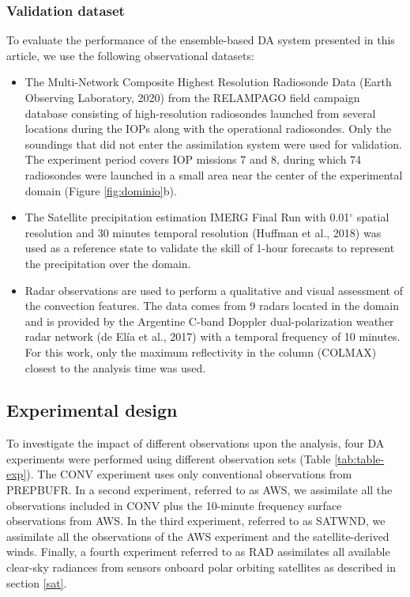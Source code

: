 \documentclass[authoryear,preprint,review,12pt]{elsarticle} %
\begin{document}
\hypertarget{validation-dataset}{%
\subsubsection{Validation dataset}\label{validation-dataset}}

To evaluate the performance of the ensemble-based DA system presented in this article, we use the following observational datasets:

\begin{itemize}
\item
  The Multi-Network Composite Highest Resolution Radiosonde Data (Earth Observing Laboratory, 2020) from the RELAMPAGO field campaign database consisting of high-resolution radiosondes launched from several locations during the IOPs along with the operational radiosondes. Only the soundings that did not enter the assimilation system were used for validation. The experiment period covers IOP missions 7 and 8, during which 74 radiosondes were launched in a small area near the center of the experimental domain (Figure \ref{fig:dominio}b).
\item
  The Satellite precipitation estimation IMERG Final Run with 0.01\(^{\circ}\) spatial resolution and 30 minutes temporal resolution (Huffman et al., 2018) was used as a reference state to validate the skill of 1-hour forecasts to represent the precipitation over the domain.
\item
  Radar observations are used to perform a qualitative and visual assessment of the convection features. The data comes from 9 radars located in the domain and is provided by the Argentine C-band Doppler dual-polarization weather radar network (de Elía et al., 2017) with a temporal frequency of 10 minutes. For this work, only the maximum reflectivity in the column (COLMAX) closest to the analysis time was used.
\end{itemize}

\hypertarget{exp}{%
\subsection{Experimental design}\label{exp}}

To investigate the impact of different observations upon the analysis, four DA experiments were performed using different observation sets (Table \ref{tab:table-exp}). The CONV experiment uses only conventional observations from PREPBUFR. In a second experiment, referred to as AWS, we assimilate all the observations included in CONV plus the 10-minute frequency surface observations from AWS. In the third experiment, referred to as SATWND, we assimilate all the observations of the AWS experiment and the satellite-derived winds. Finally, a fourth experiment referred to as RAD assimilates all available clear-sky radiances from sensors onboard polar orbiting satellites as described in section \ref{sat}.
\end{document}
